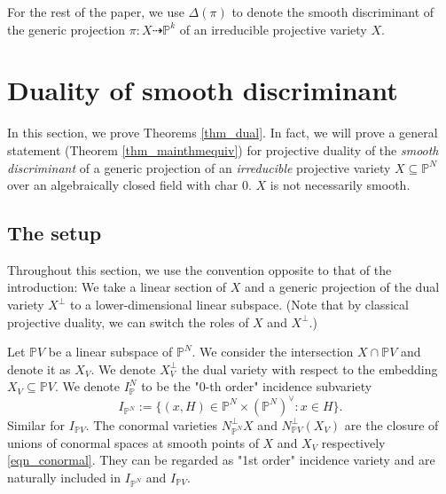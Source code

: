 \documentclass[12pt]{amsart}
\newtheorem{question}[theorem]{Question}
\begin{document}

For the rest of the paper, we use $\Delta(\pi)$ to denote the smooth discriminant of the generic projection $\pi:X\dashrightarrow\mathbb P^k$ of an irreducible projective variety $X$.



\section{Duality of smooth discriminant}\label{sec_main-thm}
In this section, we prove Theorems \ref{thm_dual}. In fact, we will prove a general statement (Theorem \ref{thm_mainthmequiv}) for projective duality of the \textit{smooth discriminant} of a generic projection of an \textit{irreducible} projective variety $X\subseteq\mathbb P^N$ over an algebraically closed field with char $0$. $X$ is not necessarily smooth. 



\subsection{The setup}
 Throughout this section, we use the convention opposite to that of the introduction: We take a linear section of $X$ and a generic projection of the dual variety $X^{\perp}$ to a lower-dimensional linear subspace. (Note that by classical projective duality, we can switch the roles of $X$ and $X^{\perp}$.)  


Let $\mathbb PV$ be a linear subspace of $\mathbb P^N$.
We consider the intersection $X\cap \mathbb PV$ and denote it as $X_V$. We denote $X_{V}^{\perp}$ the dual variety with respect to the embedding $X_V\subseteq \mathbb PV$. We denote $I_\mathbb P^N$ to be the "0-th order" incidence subvariety
$$I_{\mathbb P^N}:=\{(x,H)\in \mathbb P^N\times (\mathbb P^N)^{\vee}: x\in H\}.$$
Similar for $I_{\mathbb PV}$. The conormal varieties $N_{\mathbb P^N}^{\perp}X$ and $N^{\perp}_{\mathbb PV}(X_V)$ are the closure of unions of conormal spaces at smooth points of $X$ and $X_V$ respectively \eqref{eqn_conormal}. They can be regarded as "1st order" incidence variety and are naturally included in $I_{\mathbb P^N}$ and $I_{\mathbb PV}$. 
\end{document}
